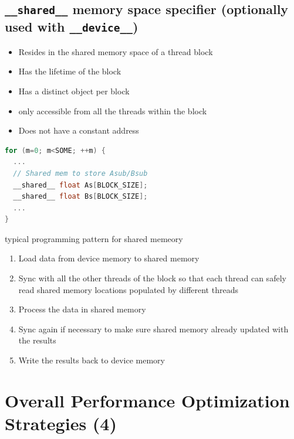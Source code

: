 \subsection*{\texttt{\_\_shared\_\_} memory space specifier (optionally used with \texttt{\_\_device\_\_})}
\begin{minipage}{0.5\linewidth}
  \flushleft
  \begin{itemize}
  \item Resides in the shared memory space of a thread block
  \item Has the lifetime of the block
  \item Has a distinct object per block
  \item only accessible from all the threads within the block
  \item Does not have a constant address
  \end{itemize}
\end{minipage}
\begin{minipage}{0.5\linewidth}
\begin{lstlisting}[language=C++,xleftmargin=1pt,framexbottommargin=2pt]
for (m=0; m<SOME; ++m) {
  ...
  // Shared mem to store Asub/Bsub
  __shared__ float As[BLOCK_SIZE];
  __shared__ float Bs[BLOCK_SIZE];
  ...
}
\end{lstlisting}
\end{minipage}
typical programming pattern for shared memeory
\begin{enumerate}
\item Load data from device memory to shared memory
\item Sync with all the other threads of the block so that each thread can safely read shared memory locations populated by different threads
\item Process the data in shared memory
\item Sync again if necessary to make sure shared memory already updated with the results
\item Write the results back to device memory
\end{enumerate}
\columnbreak
\section*{Overall Performance Optimization Strategies (4)}
